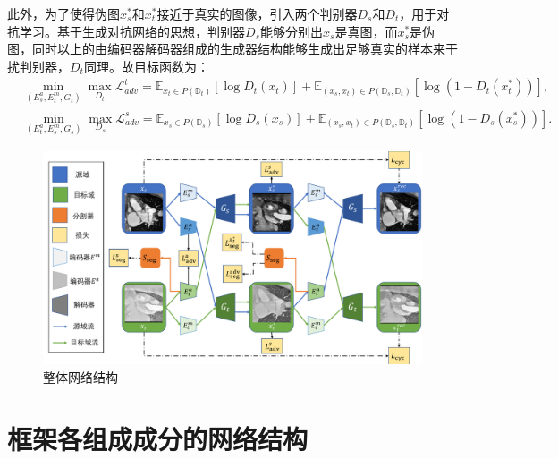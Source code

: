 此外，为了使得伪图$x_s^*$和$x_t^*$接近于真实的图像，引入两个判别器$D_s$和$D_t$，用于对抗学习。基于生成对抗网络的思想，判别器$D_s$能够分别出$x_s$是真图，而$x_s^*$是伪图，同时以上的由编码器解码器组成的生成器结构能够生成出足够真实的样本来干扰判别器，$D_t$同理。故目标函数为：
\begin{align}
&\min_{(E_s^{a},E_t^{m},G_t)}\max_{D_t} \mathcal{L}_{adv}^t= \mathbb{E}_{x_t\in P(\mathbb{D}_t)}[\log D_t(x_t)] + \mathbb{E}_{(x_s,x_t)\in P(\mathbb{D}_s,\mathbb{D}_t)}[\log (1-D_t(x_t^*))],\\
&\min_{(E_t^{a},E_s^{m},G_s)}\max_{D_s} \mathcal{L}_{adv}^s= \mathbb{E}_{x_s\in P(\mathbb{D}_s)}[\log D_s(x_s)] + \mathbb{E}_{(x_s,x_t)\in P(\mathbb{D}_s,\mathbb{D}_t)}[\log (1-D_s(x_s^*))].
\end{align}


\begin{figure}
    \centering
    \includegraphics[width=\textwidth]{image/chap03/network structure.pdf}
    \caption{整体网络结构}
    \label{fig:network}
\end{figure}

\section{框架各组成成分的网络结构}
